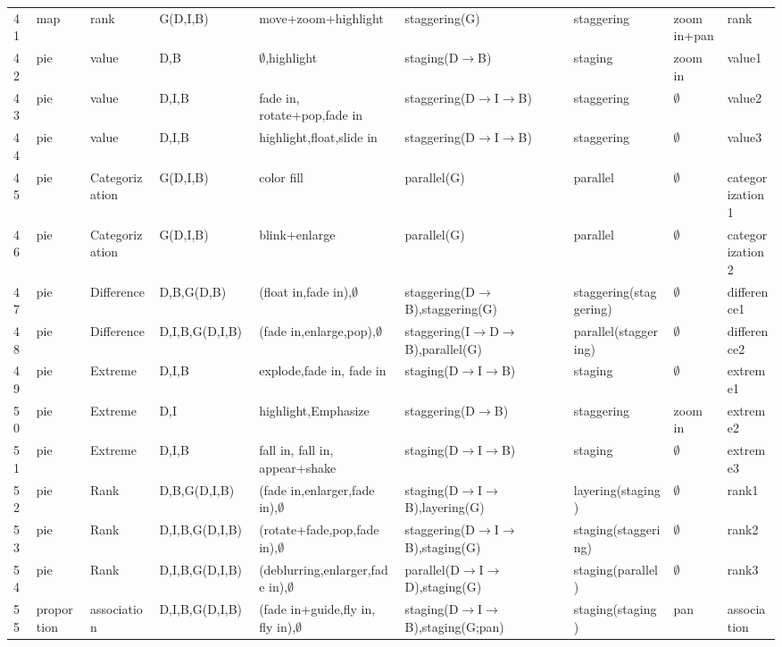 \begin{landscape}
\begin{longtable}{p{0.035\linewidth}p{0.075\linewidth}p{0.09\linewidth}p{0.13\linewidth}p{0.19\linewidth}p{0.22\linewidth}p{0.13\linewidth}p{0.075\linewidth}p{0.08\linewidth}}
41 & map & rank & G(D,I,B) & move+zoom+highlight & staggering(G) & staggering & zoom in+pan & rank \\
42 & pie & value & D,B & $\emptyset$,highlight & staging(D$\rightarrow$B) & staging & zoom in & value1 \\
43 & pie & value & D,I,B & fade in, rotate+pop,fade in & staggering(D$\rightarrow$I$\rightarrow$B) & staggering & $\emptyset$ & value2 \\
44 & pie & value & D,I,B & highlight,float,slide in & staggering(D$\rightarrow$I$\rightarrow$B) & staggering & $\emptyset$ & value3 \\
45 & pie & Categorization & G(D,I,B) & color fill & parallel(G) & parallel & $\emptyset$ & categorization1 \\
46 & pie & Categorization & G(D,I,B) & blink+enlarge & parallel(G) & parallel & $\emptyset$ & categorization2 \\
47 & pie & Difference & D,B,G(D,B) & (float in,fade in),$\emptyset$ & staggering(D$\rightarrow$B),staggering(G) & staggering(staggering) & $\emptyset$ & difference1 \\
48 & pie & Difference & D,I,B,G(D,I,B) & (fade in,enlarge,pop),$\emptyset$ & staggering(I$\rightarrow$D$\rightarrow$B),parallel(G) & parallel(staggering) & $\emptyset$ & difference2 \\
49 & pie & Extreme & D,I,B & explode,fade in, fade in & staging(D$\rightarrow$I$\rightarrow$B) & staging & $\emptyset$ & extreme1 \\
50 & pie & Extreme & D,I & highlight,Emphasize & staggering(D$\rightarrow$B) & staggering & zoom in & extreme2 \\
51 & pie & Extreme & D,I,B & fall in, fall in, appear+shake & staging(D$\rightarrow$I$\rightarrow$B) & staging & $\emptyset$ & extreme3 \\
52 & pie & Rank & D,B,G(D,I,B) & (fade in,enlarger,fade in),$\emptyset$ & staging(D$\rightarrow$I$\rightarrow$B),layering(G) & layering(staging) & $\emptyset$ & rank1 \\
53 & pie & Rank & D,I,B,G(D,I,B) & (rotate+fade,pop,fade in),$\emptyset$ & staggering(D$\rightarrow$I$\rightarrow$B),staging(G) & staging(staggering) & $\emptyset$ & rank2 \\
54 & pie & Rank & D,I,B,G(D,I,B) & (deblurring,enlarger,fade in),$\emptyset$ & parallel(D$\rightarrow$I$\rightarrow$D),staging(G) & staging(parallel) & $\emptyset$ & rank3 \\
55 & proportion & association & D,I,B,G(D,I,B) & (fade in+guide,fly in, fly in),$\emptyset$ & staging(D$\rightarrow$I$\rightarrow$B),staging(G;pan) & staging(staging) & pan & association \\

\end{longtable}
\end{landscape}
